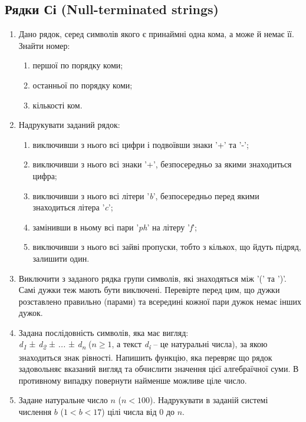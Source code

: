 \documentclass[]{article}
\makeatletter
\newcommand{\xslalph}[1]{\expandafter\@xslalph\csname c@#1\endcsname}
\newcommand{\@xslalph}[1]{%
    \ifcase#1\or а\or б\or в\or г\or д\or e\or є\or ж\or з\or i%
    \or й\or к\or л\or м\or н\or о\or п\or р\or с\or т%
    \or у\or ф\or х\or ц\or ч\or ш\or ю\or я\or аа\or бб\or вв %
    \else\@ctrerr\fi%
}
\makeatother
\begin{document}
\subsection{ Рядки Сі (Null-terminated
strings)}
\begin{enumerate}
\item
Дано рядок, серед символів якого є принаймні одна кома, а може й
немає її. Знайти номер:
\begin{enumerate}[label=\xslalph*)]
\item першої по порядку коми;
\item останньої по порядку коми;
\item кількості ком.
\end{enumerate}

\item
Надрукувати заданий рядок:
 \begin{enumerate}[label=\xslalph*)]
 \item виключивши з нього всі цифри і подвоївши знаки '+' та '-';
 \item виключивши з нього всі знаки '+', безпосередньо за якими знаходиться
цифра;
 \item виключивши з нього всі літери '\emph{b}', безпосередньо перед якими
знаходиться літера '\emph{c}';
 \item замінивши в ньому всі пари '\emph{ph}' на літеру '\emph{f}';
 \item виключивши з нього всі зайві пропуски, тобто з кількох, що йдуть
підряд, залишити один.
\end{enumerate}

\item
Виключити з заданого рядка групи символів, які знаходяться між '(' та
')'. Самі дужки теж мають бути виключені. Перевірте перед цим, що дужки
розставлено правильно (парами) та всередині кожної пари дужок немає
інших дужок.

\item
Задана послідовність символів, яка має вигляд:\\
\emph{d\textsubscript{1}} ± \emph{d\textsubscript{2}} ± \emph{...} ±
\emph{d\textsubscript{n }} ($n \ge 1 $, а текст \emph{d\textsubscript{i }} -- це натуральні
числа), за якою знаходиться знак рівності.
Напишить функцію, яка перевряє що рядок задовольняє вказаний вигляд та обчислити значення
цієї алгебраїчної суми. В противному випадку повернути найменше можливе ціле число.

\item
Задане натуральне число $n$ ($n<100$). Надрукувати в заданій системі числення $b$ ($1<b<17$)
цілі числа від 0 до $n$.


\end{enumerate}
\end{document}
